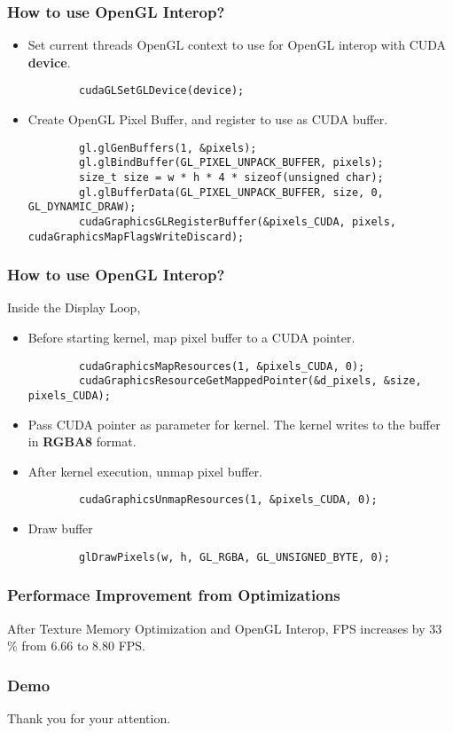 \documentclass{beamer}
\begin{document}

\begin{frame}[fragile]
	\frametitle{How to use OpenGL Interop?}
	\begin{itemize}
		\item Set current threads OpenGL context to use for OpenGL interop with CUDA \textbf{device}.
		\begin{lstlisting}
		cudaGLSetGLDevice(device);
		\end{lstlisting}
		\item Create OpenGL Pixel Buffer, and register to use as CUDA buffer.
		\begin{lstlisting}
		gl.glGenBuffers(1, &pixels);
		gl.glBindBuffer(GL_PIXEL_UNPACK_BUFFER, pixels);
		size_t size = w * h * 4 * sizeof(unsigned char);
		gl.glBufferData(GL_PIXEL_UNPACK_BUFFER, size, 0, GL_DYNAMIC_DRAW);
		cudaGraphicsGLRegisterBuffer(&pixels_CUDA, pixels, cudaGraphicsMapFlagsWriteDiscard);
		\end{lstlisting}
	\end{itemize}
\end{frame}

\begin{frame}[fragile]
	\frametitle{How to use OpenGL Interop?}
	Inside the Display Loop,
	\begin{itemize}
		\item Before starting kernel, map pixel buffer to a CUDA pointer.
		\begin{lstlisting}
		cudaGraphicsMapResources(1, &pixels_CUDA, 0); 
		cudaGraphicsResourceGetMappedPointer(&d_pixels, &size,  pixels_CUDA);
		\end{lstlisting}
		\item Pass CUDA pointer as parameter for kernel. The kernel writes to the buffer in \textbf{RGBA8} format.
		\item After kernel execution, unmap pixel buffer.
		\begin{lstlisting}
		cudaGraphicsUnmapResources(1, &pixels_CUDA, 0);
		\end{lstlisting}
		\item Draw buffer
		\begin{lstlisting}
		glDrawPixels(w, h, GL_RGBA, GL_UNSIGNED_BYTE, 0);
		\end{lstlisting}
	\end{itemize}
\end{frame}

\begin{frame}
	\frametitle{Performace Improvement from Optimizations}
	After Texture Memory Optimization and OpenGL Interop, FPS increases by 33 \% from 6.66 to 8.80 FPS.
\end{frame}

\begin{frame}
  \frametitle{Demo}
  \huge{\centerline{Thank you for your attention.}}
\end{frame}
\end{document}
